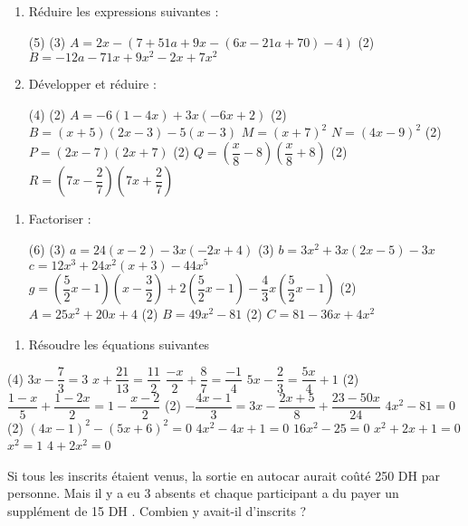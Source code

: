 \documentclass[a4paper,12pt]{article}
\begin{document}
\devoir[sem=2,prv=true,ds=false,num=4 ,niv=2 , date=23/02/2023,Rdate=27/02/2023]

\begin{exo}
\begin{enumerate}
\item Réduire les expressions suivantes :
\begin{EnvFullwidth}
\begin{tasks}[style=itemize](5)
\task*(3) $A=2x-\left(7+51a+9x-\left(6x-21a+70\right)-4\right)$
\task*(2) $B=-12a-71x+9x^{2}-2x+7x^{2}$
\end{tasks}
\end{EnvFullwidth}
\item Développer et réduire :
\begin{tasks}[style=itemize](4)
\task*(2) $A=-6\left(1-4x\right)+3x\left(-6x+2\right)$
\task*(2) $B=\left(x+5\right)\left(2x-3\right)-5\left(x-3\right)$
\task $M=\left(x+7\right)^{2}$
\task $N=\left(4x-9\right)^{2}$
\task*(2) $P=\left(2x-7\right)\left(2x+7\right)$
\task*(2) $Q=\left(\dfrac{x}{8}-8\right)\left(\dfrac{x}{8}+8\right)$
\task*(2) $R=\left(7x-\dfrac{2}{7}\right)\left(7x+\dfrac{2}{7}\right)$
\end{tasks}
\end{enumerate}
\end{exo}

\begin{exo}
\begin{enumerate}
\item Factoriser :
\begin{tasks}[style=itemize](6)
\task*(3) $a=24\left(x-2\right)-3x\left(-2x+4\right)$
\task*(3) $b=3x^{2}+3x\left(2x-5\right)-3x$
\task* $c=12x^{3}+24x^{2}\left(x+3\right)-44x^{5}$
\task* $g=\left(\dfrac{5}{2}x-1\right)\left(x-\dfrac{3}{2}\right)+2\left(\dfrac{5}{2}x-1\right)-\dfrac{4}{3}x\left(\dfrac{5}{2}x-1\right)$
\task*(2) $A=25x^{2}+20x+4$
\task*(2) $B=49x^{2}-81$
\task*(2) $C=81-36x+4x^{2}$
\end{tasks}
\end{enumerate}
\end{exo}

\begin{exo}
\begin{enumerate}
\item Résoudre les équations suivantes 
\end{enumerate}
\begin{tasks}[style=itemize](4)
\task $3x-\dfrac{7}{3}=3$
\task $x+\dfrac{21}{13}=\dfrac{11}{2}$
\task $\dfrac{-x}{2}+\dfrac{8}{7}=\dfrac{-1}{4}$
\task $5x-\dfrac{2}{3}=\dfrac{5x}{4}+1$
\task*(2) $\dfrac{1-x}{5}+\dfrac{1-2x}{2}=1-\dfrac{x-2}{2}$
\task*(2) $-\dfrac{4x-1}{3}=3x-\dfrac{2x+5}{8}+\dfrac{23-50x}{24}$
\task $4x^{2}-81=0$
\task*(2) $\left(4x-1\right)^{2}-(5x+6)^{2}=0$
\task $4x^{2}-4x+1=0$
\task $16x^{2}-25=0$
\task $x^{2}+2x+1=0$
\task $x^{2}=1$
\task $4+2x^{2}=0$
\end{tasks}
\end{exo}

\begin{exo}
Si tous les inscrits étaient venus, la sortie en autocar aurait coûté 250 DH par personne. Mais il y a eu 3 absents et chaque participant a du payer un supplément de 15 DH . Combien y avait-il d'inscrits ?
\end{exo}
\end{document}
